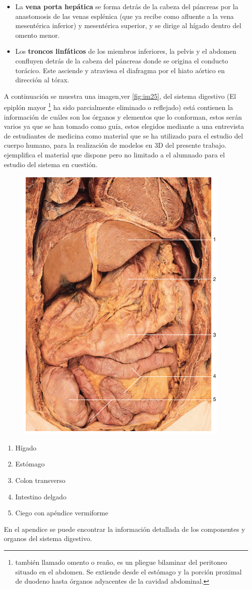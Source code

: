 \begin{itemize}
	\item La \textbf{vena porta hepática} se forma detrás de la cabeza del páncreas por la anastomosis de las venas esplénica (que ya recibe como afluente a la vena mesentérica inferior) y mesentérica superior, y se dirige al hígado dentro del omento menor.
	\item Los \textbf{troncos linfáticos} de los miembros inferiores, la pelvis y el abdomen confluyen detrás de la cabeza del páncreas donde se origina el conducto torácico. Este asciende y atraviesa el diafragma por el hiato aórtico en dirección al tórax.
\end{itemize}
A continuación se muestra una imagen,ver \ref{fig:im25}, del sistema digestivo (El epiplón mayor
\footnote{ también llamado omento o reaño, es un pliegue bilaminar del peritoneo situado en el abdomen. Se extiende desde el estómago y la porción proximal de duodeno hasta órganos adyacentes de la cavidad abdominal.} 
ha sido parcialmente eliminado o reflejado)  está contienen la información de cuáles son los órganos y elementos que lo conforman, estos serán 
varios ya que se han tomado como guía, estos elegidos mediante a una entrevista de estudiantes de medicina como material que se ha utilizado para el estudio del cuerpo 
humano, para la realización de modelos en 3D del presente trabajo. ejemplifica el material que dispone pero no limitado a el alumnado para el estudio del sistema en cuestión.\\
\begin{figure}[H]
	\begin{center}
 		\includegraphics[width = .5\textwidth]{source/images/image72.png}
	\end{center} 
\end{figure}
\begin{enumerate}
	\item Hígado
	\item Estómago
	\item Colon transverso
	\item Intestino delgado
	\item Ciego con apéndice vermiforme	
\end{enumerate}
En el apendice se puede encontrar la información detallada de los componentes y organos del sistema digestivo.

